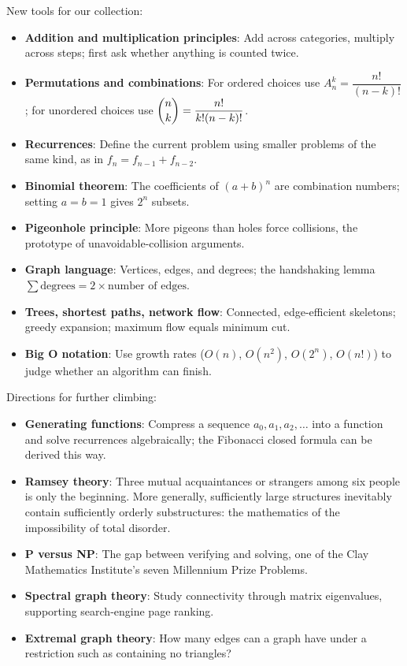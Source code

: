 \begin{toolbox}
New tools for our collection:
\begin{itemize}
\item \textbf{Addition and multiplication principles}: Add across categories, multiply across steps; first ask whether anything is counted twice.
\item \textbf{Permutations and combinations}: For ordered choices use $A_n^k=\dfrac{n!}{(n-k)!}$; for unordered choices use $\dbinom{n}{k}=\dfrac{n!}{k!(n-k)!}$.
\item \textbf{Recurrences}: Define the current problem using smaller problems of the same kind, as in $f_n=f_{n-1}+f_{n-2}$.
\item \textbf{Binomial theorem}: The coefficients of $(a+b)^n$ are combination numbers; setting $a=b=1$ gives $2^n$ subsets.
\item \textbf{Pigeonhole principle}: More pigeons than holes force collisions, the prototype of unavoidable-collision arguments.
\item \textbf{Graph language}: Vertices, edges, and degrees; the handshaking lemma $\sum\text{degrees}=2\times\text{number of edges}$.
\item \textbf{Trees, shortest paths, network flow}: Connected, edge-efficient skeletons; greedy expansion; maximum flow equals minimum cut.
\item \textbf{Big O notation}: Use growth rates ($O(n)$, $O(n^2)$, $O(2^n)$, $O(n!)$) to judge whether an algorithm can finish.
\end{itemize}
\end{toolbox}

\begin{pandeng}
Directions for further climbing:
\begin{itemize}
\item \textbf{Generating functions}: Compress a sequence $a_0,a_1,a_2,\dots$ into a function and solve recurrences algebraically; the Fibonacci closed formula can be derived this way.
\item \textbf{Ramsey theory}: Three mutual acquaintances or strangers among six people is only the beginning. More generally, sufficiently large structures inevitably contain sufficiently orderly substructures: the mathematics of the impossibility of total disorder.
\item \textbf{P versus NP}: The gap between verifying and solving, one of the Clay Mathematics Institute's seven Millennium Prize Problems.
\item \textbf{Spectral graph theory}: Study connectivity through matrix eigenvalues, supporting search-engine page ranking.
\item \textbf{Extremal graph theory}: How many edges can a graph have under a restriction such as containing no triangles?
\end{itemize}
\end{pandeng}

